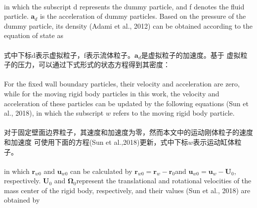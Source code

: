 \documentclass[UTF8]{ctexart}
\begin{document}
{{%

\paragraph{\quad}in which the subscript d represents the dummy particle, 
                and f denotes the fluid particle. $\mathbf{a}_d$ is the acceleration 
                of dummy particles. Based on the pressure of the dummy 
                particle, its density (Adami et al., 2012) can be obtained 
                according to the equation of state as
\paragraph{\quad}式中下标d表示虚拟粒子，f表示流体粒子。$\mathbf{a}_d$是虚拟粒子的加速度。基于
                虚拟粒子的压力，可以通过下式形式的状态方程得到其密度：


\paragraph{\quad}For the fixed wall boundary particles, their velocity and 
                acceleration are zero, while for the moving rigid body 
                particles in this work, the velocity and acceleration 
                of these particles can be updated by the following 
                equations (Sun et al., 2018), in which the subscript $ w$ 
                refers to the moving rigid body particle.
\paragraph{\quad}对于固定壁面边界粒子，其速度和加速度为零，然而本文中的运动刚体粒子的速度和加速度
            可使用下面的方程(Sun et al.,2018)更新，式中下标$w$表示运动缸体粒子。


\paragraph{\quad}in which $\mathbf{r}_{w0}$ and $\mathbf{u}_{w0}$ can be calculated by
             $\mathbf{r}_{w0} = \mathbf{r}_w-\mathbf{r}_0 $and $\mathbf{u}_{w0} = \mathbf{u}_w-\mathbf{U}_0$, 
                respectively. $\mathbf{U}_0$ and $\mathbf{\Omega}_0$represent the translational and rotational 
                velocities of the mass center of the rigid body, respectively, and 
                their values (Sun et al., 2018) are obtained by
}}
\end{document}
